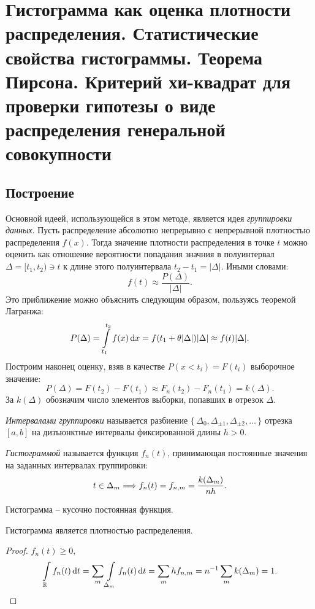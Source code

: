 \section{Гистограмма как оценка плотности распределения. Статистические
    свойства гистограммы. Теорема Пирсона. Критерий хи-квадрат для проверки
гипотезы о виде распределения генеральной совокупности}

\subsection{Построение}
Основной идеей, использующейся в этом методе, является идея \textit{группировки
данных}. Пусть распределение абсолютно непрерывно с непрерывной плотностью
распределения $f(x)$. Тогда значение плотности распределения в точке $t$
можно оценить как отношение вероятности попадания значния в полуинтервал
$\Delta = [t_1, t_2) \ni t$ к длине этого полуинтервала $t_2 - t_1 = |\Delta|$.
Иными словами:
\[
    f(t) \approx \frac{P(\Delta)}{|\Delta|}
.\]
Это приближение можно объяснить следующим образом, пользуясь теоремой Лагранжа:
\[
    P(\Delta) = \int\limits_{t_1}^{t_2}{f(x) \,\mathrm{d} x} = f(t_1 + \theta |\Delta|) |\Delta|
    \approx f(t) |\Delta|
.\]
Построим наконец оценку, взяв в качестве $P(x < t_i) = F(t_i)$
выборочное значение:
\[
    P(\Delta) = F(t_2) - F(t_1) \approx F_n(t_2) - F_n(t_1) = k(\Delta)
.\]
За $k(\Delta)$ обозначим число элементов выборки, попавших в отрезок $\Delta$.

\begin{definition}
    \textit{Интервалами группировки} называется разбиение
    $\{\,\Delta_0, \Delta_{\pm 1}, \Delta_{\pm 2}, \ldots\,\}$ отрезка
    $[a, b]$ на дизъюнктные интервалы фиксированной длины $h > 0$.
\end{definition}

\begin{definition}
    \textit{Гистограммой} называется функция $f_n(t)$, принимающая
    постоянные значения на заданных интервалах группировки:
    \[
        t \in \Delta_m \Longrightarrow f_{n}(t) = f_{n, m} = \frac{k(\Delta_m)}{nh}
    .\]
\end{definition}

\begin{remark}
    Гистограмма -- кусочно постоянная функция.
\end{remark}

\begin{theorem}
    Гистограмма является плотностью распределения.
\end{theorem}
\begin{proof}
    $f_n(t) \geqslant 0$,
    \[
        \int\limits_{\mathbb{R}}{f_n(t) \,\mathrm{d} t} = \sum_{m}{\int\limits_{\Delta_m}{f_{n}(t) \,\mathrm{d} t}} =
        \sum_{m}{h f_{n, m}} = n^{-1} \sum_m{k(\Delta_m)} = 1
    .\]
\end{proof}

